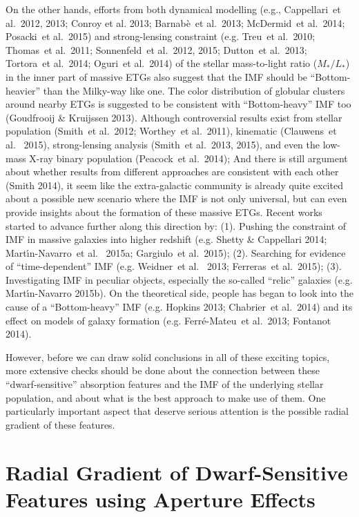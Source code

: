 \documentclass[preprint]{aastex}
\def\etal{{\ et al.~}}
\def\m2l{$M_{\ast}/L_{\ast}$}
\begin{document}
\begin{CJK*}{UTF8}{gbsn}
  On the other hands, efforts from both dynamical modelling (e.g., 
  Cappellari\etal 2012, 2013; Conroy et al. 2013;  Barnab{\`e}\etal 2013; 
  McDermid\etal 2014; Posacki\etal 2015) and strong-lensing constraint 
  (e.g. Treu\etal 2010; Thomas\etal 2011; Sonnenfeld\etal 2012, 2015; 
  Dutton\etal 2013; Tortora\etal 2014; Oguri\etal 2014) of the stellar 
  mass-to-light ratio (\m2l) in the inner part of massive ETGs
  also suggest that the IMF should be ``Bottom-heavier'' than the Milky-way
  like one.  The color distribution of globular clusters around nearby ETGs is 
  suggested to be consistent with ``Bottom-heavy'' IMF too (Goudfrooij \& 
  Kruijssen 2013).  Although controversial results exist from stellar 
  population (Smith\etal 2012; Worthey\etal 2011), kinematic (Clauwens\etal
  2015), strong-lensing analysis (Smith\etal 2013, 2015), and even the
  low-mass X-ray binary population (Peacock\etal 2014); And there is still 
  argument about whether results from different approaches are consistent
  with each other (Smith 2014), it seem like the extra-galactic community 
  is already quite excited about a possible new scenario where the IMF is 
  not only universal, but can even provide insights about the formation of
  these massive ETGs.  Recent works started to advance further along this 
  direction by: 
  (1). Pushing the constraint of IMF in massive galaxies into higher 
       redshift (e.g. Shetty \& Cappellari 2014; Mart{\'{\i}}n-Navarro\etal 
       2015a; Gargiulo\etal 2015); 
  (2). Searching for evidence of ``time-dependent'' IMF (e.g. Weidner\etal 
       2013; Ferreras\etal 2015); 
  (3). Investigating IMF in peculiar objects, especially the so-called 
       ``relic'' galaxies (e.g. Mart{\'{\i}}n-Navarro 2015b).  
  On the theoretical side, people has began to look into the cause of a 
  ``Bottom-heavy'' IMF (e.g. Hopkins 2013; Chabrier\etal 2014) 
  and its effect on models of galaxy formation 
  (e.g. Ferr{\'e}-Mateu\etal 2013; Fontanot 2014).  

  However, before we can draw solid conclusions in all of these 
  exciting topics, more extensive checks should be done about the 
  connection between these ``dwarf-sensitive'' absorption features
  and the IMF of the underlying stellar population, and about what is 
  the best approach to make use of them.  One particularly important
  aspect that deserve serious attention is the possible radial 
  gradient of these features. 

\section{Radial Gradient of Dwarf-Sensitive Features using 
 Aperture Effects} 
 

\end{CJK*}
\end{document}
